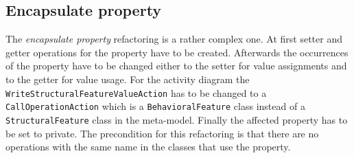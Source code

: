 \documentclass{llncs}
\begin{document}
\subsection{Encapsulate property}
\label{sec:encapsulate}
The \textit{encapsulate property} refactoring is a rather complex one. At first setter and getter operations for the property have to be 
created. Afterwards the occurrences of the property have to be changed either to the setter for value assignments and to the getter 
for value usage. For the activity diagram the \texttt{Write\-Structural\-Feature\-Value\-Action} has to be changed to a 
\texttt{Call\-Operation\-Action} which is a \texttt{BehavioralFeature} class instead of a \texttt{StructuralFeature} class in 
the meta-model. Finally the affected property has to be set to private. The precondition for this refactoring is that there are no 
operations with the same name in the classes that use the property.
\end{document}
